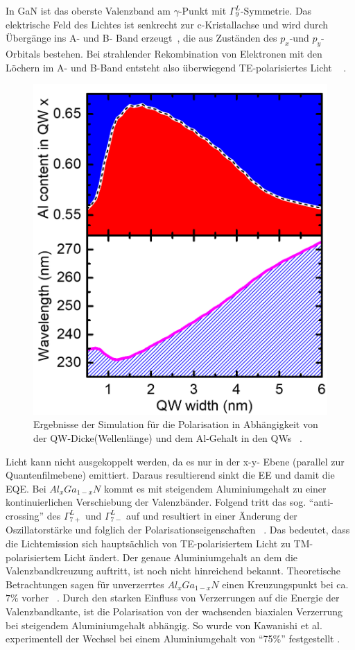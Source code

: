In GaN ist das oberste Valenzband am $\gamma$-Punkt mit $\Gamma^{L}_{9}$-Symmetrie. Das elektrische Feld des Lichtes ist senkrecht zur c-Kristallachse und wird durch Übergänge ins A- und B- Band erzeugt~\cite{doi:10.1063/1.3574025}, die aus Zuständen des $p_x$-und $p_y$-Orbitals bestehen. Bei strahlender Rekombination von Elektronen mit den Löchern im A- und B-Band entsteht also überwiegend TE-polarisiertes Licht ~\cite{doi:10.1063/1.3574025} . 
%
\begin{figure}[htb]
  \centering
  \begin{minipage}{\linewidth}
      \centering
      \includegraphics[width=0.6\linewidth]{Bilder/christophPolarisationSimu1.png}
      \caption{Ergebnisse der Simulation für die Polarisation in Abhängigkeit von der QW-Dicke(Wellenlänge) und dem Al-Gehalt in den QWs ~\cite{doi:10.1063/1.4932651}.}
      \label{fig:simu1chr}
  \end{minipage}
\end{figure}
%
Licht kann nicht ausgekoppelt werden, da es nur in der x-y- Ebene (parallel zur Quantenfilmebene) emittiert. Daraus resultierend sinkt die EE und damit die EQE. Bei $Al_{x}Ga_{1-x}N$ kommt es mit steigendem Aluminiumgehalt zu einer kontinuierlichen Verschiebung der Valenzbänder. Folgend tritt das sog. "`anti-crossing"' des $\Gamma^{L}_{7+}$ und $\Gamma^{L}_{7-}$ auf und resultiert in einer Änderung der Oszillatorstärke und folglich der Polarisationseigenschaften ~\cite{doi:10.1063/1.4932651}.
Das bedeutet, dass die Lichtemission sich hauptsächlich von TE-polarisiertem Licht zu TM-polarisiertem Licht ändert. Der genaue Aluminiumgehalt an dem die Valenzbandkreuzung auftritt, ist noch nicht hinreichend bekannt. Theoretische Betrachtungen sagen für unverzerrtes $Al_{x}Ga_{1-x}N$ einen Kreuzungspunkt bei ca. $7\%$ vorher ~\cite{doi:10.1063/1.3675451}. Durch den starken Einfluss von Verzerrungen auf die Energie der  Valenzbandkante, ist die Polarisation von der wachsenden biaxialen Verzerrung bei steigendem Aluminiumgehalt abhängig. So wurde von Kawanishi et al. experimentell der Wechsel bei einem Aluminiumgehalt von "`75\%"' festgestellt \cite{doi:10.1063/1.2410242}. 
